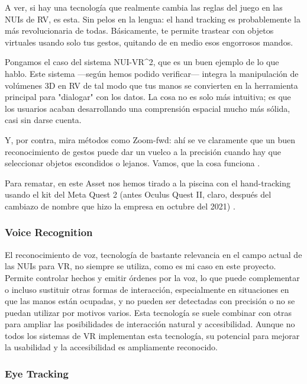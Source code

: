 A ver, si hay una tecnología que realmente cambia las reglas del juego en las NUIs de RV, es esta. Sin pelos en la lengua: el hand tracking es probablemente la más revolucionaria de todas. Básicamente, te permite trastear con objetos virtuales usando solo tus gestos, quitando de en medio esos engorrosos mandos. 

Pongamos el caso del sistema NUI-VR\textasciicircum2, que es un buen ejemplo de lo que hablo. Este sistema —según hemos podido verificar— integra la manipulación de volúmenes 3D en RV de tal modo que tus manos se convierten en la herramienta principal para "dialogar" con los datos. La cosa no es solo más intuitiva; es que los usuarios acaban desarrollando una comprensión espacial mucho más sólida, casi sin darse cuenta. 

Y, por contra, mira métodos como Zoom-fwd: ahí se ve claramente que un buen reconocimiento de gestos puede dar un vuelco a la precisión cuando hay que seleccionar objetos escondidos o lejanos. Vamos, que la cosa funciona \cite{NUI-VR2} \cite{FrameworkVR} \cite{ZoomFwd}.

Para rematar, en este Asset nos hemos tirado a la piscina con el hand-tracking usando el kit del Meta Quest 2 (antes Oculus Quest II, claro, después del cambiazo de nombre que hizo la empresa en octubre del 2021) \cite{abdlkarim2024methodological}.

\subsubsection{Voice Recognition}

El reconocimiento de voz, tecnología de bastante relevancia en el campo actual de las NUIs para VR, no siempre se utiliza, como es mi caso en este proyecto. Permite controlar hechos y emitir órdenes por la voz, lo que puede complementar o incluso sustituir otras formas de interacción, especialmente en situaciones en que las manos están ocupadas, y no pueden ser detectadas con precisión o no se puedan utilizar por motivos varios. Esta tecnología se suele combinar con otras para ampliar las posibilidades de interacción natural y accesibilidad. Aunque no todos los sistemas de VR implementan esta tecnología, su potencial para mejorar la usabilidad y la accesibilidad es ampliamente reconocido. \cite{GestureOverview} \cite{RedefiningNUI}

\subsubsection{Eye Tracking}


